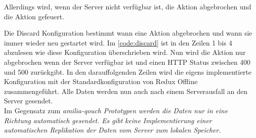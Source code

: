 Allerdings wird, wenn der Server nicht verfügbar ist, die Aktion abgebrochen und die  Aktion gefeuert.
\begin{center}
  
\end{center}
%
Die Discard Konfiguration bestimmt wann eine Aktion abgebrochen und wann sie immer wieder neu gestartet wird.
Im \autoref{code:discard} ist in den Zeilen 1 bis 4 abzulesen wie diese Konfiguration überschrieben wird. Nun wird die Aktion nur abgebrochen wenn der Server verfügbar ist und einen \gls{HTTP} Status zwischen 400 und 500 zurückgibt.
In den darauffolgenden Zeilen wird die eigens implementierte Konfiguration mit der Standardkonfiguration von Redux Offline zusammengeführt.
Alle Daten werden nun auch nach einem Serverausfall an den Server gesendet.\\
Im Gegensatz zum \it{amilia-qouch} Prototypen werden die Daten nur in eine Richtung automatisch gesendet.
Es gibt keine Implementierung einer automatischen Replikation der Daten vom Server zum lokalen Speicher.